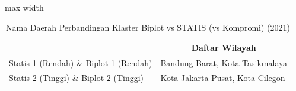 \begin{table}[H]
\centering
\caption{Nama Daerah Perbandingan Klaster Biplot vs STATIS (vs Kompromi) (2021)} \label{tab:sample1biplot_statis_name_2021}
\begin{adjustbox}{max width=\textwidth}
\begin{tabular}{|>{\centering\arraybackslash}p{4cm}|p{10cm}|}
\hline
\multicolumn{1}{|c|}{\textbf{Kategori}} & \multicolumn{1}{c|}{\textbf{Daftar Wilayah}} \\
\hline
Statis 1 (Rendah) \& Biplot 1 (Rendah) & Bandung Barat, Kota Tasikmalaya \\
\hline
Statis 2 (Tinggi) \& Biplot 2 (Tinggi) & Kota Jakarta Pusat, Kota Cilegon \\
\hline
\end{tabular}
\end{adjustbox}
\end{table}